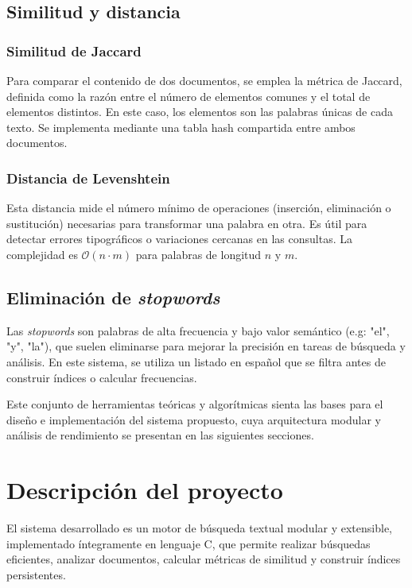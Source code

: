 \documentclass[9pt,letterpaper,onecolumn]{rho-class/rho}
\begin{document}
\subsection{Similitud y distancia}

\subsubsection*{Similitud de Jaccard}

Para comparar el contenido de dos documentos, se emplea la métrica de Jaccard, definida como la razón entre el número de elementos comunes y el total de elementos distintos. En este caso, los elementos son las palabras únicas de cada texto. Se implementa mediante una tabla hash compartida entre ambos documentos.

\subsubsection*{Distancia de Levenshtein}

Esta distancia mide el número mínimo de operaciones (inserción, eliminación o sustitución) necesarias para transformar una palabra en otra. Es útil para detectar errores tipográficos o variaciones cercanas en las consultas. La complejidad es $\mathcal{O}(n \cdot m)$ para palabras de longitud $n$ y $m$.

\subsection{Eliminación de \textit{stopwords}}

Las \textit{stopwords} son palabras de alta frecuencia y bajo valor semántico (e.g: "el", "y", "la"), que suelen eliminarse para mejorar la precisión en tareas de búsqueda y análisis. En este sistema, se utiliza un listado en español que se filtra antes de construir índices o calcular frecuencias.

\vspace{0.5em}
Este conjunto de herramientas teóricas y algorítmicas sienta las bases para el diseño e implementación del sistema propuesto, cuya arquitectura modular y análisis de rendimiento se presentan en las siguientes secciones.


\section{Descripción del proyecto}
\label{sec:implementacion}

El sistema desarrollado es un motor de búsqueda textual modular y extensible, implementado íntegramente en lenguaje C, que permite realizar búsquedas eficientes, analizar documentos, calcular métricas de similitud y construir índices persistentes.
\end{document}
